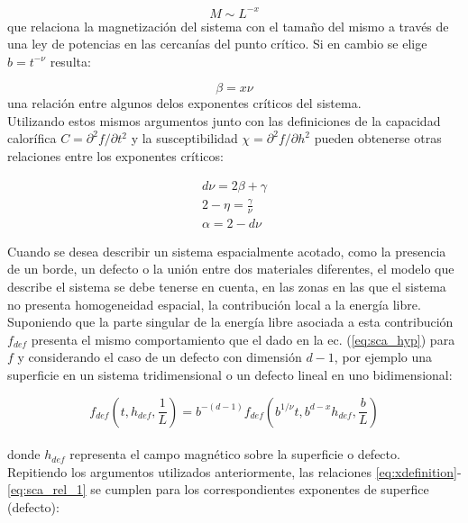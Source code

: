\begin{equation}
		\label{eq:xdefinition}
		M\sim L^{-x}
\end{equation}
que relaciona la magnetización del sistema con el tamaño del mismo a través de
 una ley de potencias en las cercanías del punto crítico.
Si en cambio se elige $b=t^{-\nu}$ resulta:

\begin{equation}
	\label{eq:sca_rel_1}
	\beta =x\nu
\end{equation}
 una relación entre algunos delos exponentes críticos del sistema.\\
Utilizando estos mismos argumentos junto con las definiciones de la capacidad
calorífica $C=\partial^{2} f/\partial t^{2}$ y la susceptibilidad
 $\chi=\partial^{2} f/\partial h^{2}$ pueden obtenerse otras relaciones entre
 los exponentes críticos:

\begin{center} 
\begin{eqnarray}
	\label{eq:sca_rel_2}
	d\nu =2\beta +\gamma \\
	\label{eq:sca_rel_3}
	2-\eta =\frac{\gamma}{\nu} \\
	\label{eq:sca_rel_4}
	\alpha = 2 - d\nu
\end{eqnarray}
\end{center}

Cuando se desea describir un sistema espacialmente acotado, como la presencia de
 un borde, un defecto o la unión entre dos materiales diferentes, el modelo que
 describe el sistema se debe tenerse en cuenta, en las zonas en las que el sistema
 no presenta homogeneidad espacial, la contribución local a la energía libre.
 Suponiendo que la parte singular de la energía libre asociada a esta contribución
 $f_{def}$ presenta el mismo comportamiento que el dado en la ec. (\ref{eq:sca_hyp})
 para $f$ y considerando el caso de un defecto con dimensión $d-1$, por ejemplo
 una superficie en un sistema tridimensional o un defecto lineal en uno bidimensional:
 
\begin{equation}
	\label{eq:sca_def}
	f_{def}(t,h_{def},\frac{1}{L})=b^{-(d-1)}f_{def}(b^{1/\nu}t,b^{d-x}h_{def},\frac{b}{L})
\end{equation}
\\
 donde $h_{def}$ representa el campo magnético sobre la superficie o defecto.\\
Repitiendo los argumentos utilizados anteriormente, las relaciones \ref{eq:xdefinition}-\ref{eq:sca_rel_1} se cumplen para
 los correspondientes exponentes de superfice (defecto):
 
